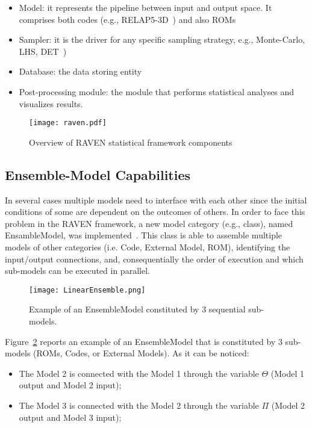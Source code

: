 \begin{itemize}
  \item Model: it represents the pipeline between input and output space. It comprises both codes 
        (e.g., RELAP5-3D~\cite{relap5}) and also ROMs 
  \item Sampler: it is the driver for any specific sampling strategy, e.g., Monte-Carlo, LHS, 
        DET~\cite{ANS2014_adaptDET,PSA2013_Raven})
  \item Database: the data storing entity
  \item Post-processing module: the module that performs statistical analyses and visualizes results.
\end{itemize}

\begin{figure}
    \centering
    \centerline{\texttt{[image: raven.pdf]}} 
    \caption{Overview of RAVEN statistical framework components}
    \label{fig:ravenScheme}
\end{figure}

\subsection{Ensemble-Model Capabilities}

In several cases multiple models need to interface with each other since the initial 
conditions of some are dependent on the outcomes of others. In order to face this problem 
in the RAVEN framework, a new model category (e.g., class), named EnsambleModel, was 
implemented~\cite{alfonsiEnsemble}. This class is able to assemble multiple models of 
other categories (i.e. Code, External Model, ROM), identifying the input/output connections, 
and, consequentially the order of execution and which sub-models can be executed in parallel. 
 
\begin{figure}
    \centering
    \centerline{\texttt{[image: LinearEnsemble.png]}} 
    \caption{Example of an EnsembleModel constituted by 3 sequential sub-models.}
    \label{fig:exampleEnsembleModel}
\end{figure}
 
Figure~\ref{fig:exampleEnsembleModel} reports an example of an EnsembleModel that is constituted by 
3 sub-models (ROMs, Codes, or External Models). As it can be noticed:

\begin{itemize}
  \item The Model 2 is connected with the Model 1 through the variable $\Theta$ (Model 1 output and Model 2 input);
  \item The Model 3 is connected with the Model 2 through the variable $\Pi$ (Model 2 output and Model 3 input);
\end{itemize}

